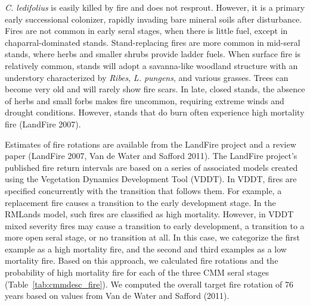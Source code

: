 \emph{C. ledifolius} is easily killed by fire and does not resprout. However, it is a primary early successional colonizer, rapidly invading bare mineral soils after disturbance. Fires are not common in early seral stages, when there is little fuel, except in chaparral-dominated stands. Stand-replacing fires are more common in mid-seral stands, where herbs and smaller shrubs provide ladder fuels. When surface fire is relatively common, stands will adopt a savanna-like woodland structure with an understory characterized by \emph{Ribes}, \emph{L. pungens}, and various grasses. Trees can become very old and will rarely show fire scars. In late, closed stands, the absence of herbs and small forbs makes fire uncommon, requiring extreme winds and drought conditions. However, stands that do burn often experience high mortality fire (LandFire 2007).

Estimates of fire rotations are available from the LandFire project and a review paper (LandFire 2007, Van de Water and Safford 2011). The LandFire project's published fire return intervals are based on a series of associated models created using the Vegetation Dynamics Development Tool (VDDT). In VDDT, fires are specified concurrently with the transition that follows them. For example, a replacement fire causes a transition to the early development stage. In the RMLands model, such fires are classified as high mortality. However, in VDDT mixed severity fires may cause a transition to early development, a transition to a more open seral stage, or no transition at all. In this case, we categorize the first example as a high mortality fire, and the second and third examples as a low mortality fire. Based on this approach, we calculated fire rotations and the probability of high mortality fire for each of the three CMM seral stages (Table~\ref{tab:cmmdesc_fire}). We computed the overall target fire rotation of 76 years based on values from Van de Water and Safford (2011). 




